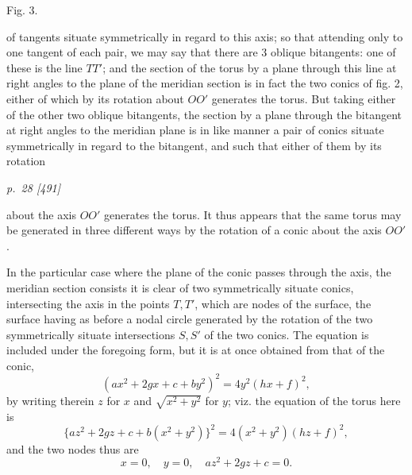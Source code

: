 ﻿\documentclass[11pt,a4paper]{article}
\theoremstyle{plain}
\theoremstyle{definition}
\begin{document}
\begin{center}
\small Fig. 3.

\end{center}

of tangents situate symmetrically in regard to this axis; so that attending
only to one tangent of each pair, we may say that there are 3 oblique
bitangents: one of these is the line \(TT'\); and the section of the torus by
a plane through this line at right angles to the plane of the meridian section
is in fact the two conics of fig. 2, either of which by its rotation about
\(OO'\) generates the torus. But taking either of the other two oblique
bitangents, the section by a plane through the bitangent at right angles to
the meridian plane is in like manner a pair of conics situate symmetrically in
regard to the bitangent, and such that either of them by its rotation

\clearpage
\textit{p.~28 [491]}

about the axis \(OO'\) generates the torus. It thus appears that the same
torus may be generated in three different ways by the rotation of a conic
about the axis \(OO'\).

In the particular case where the plane of the conic passes through the axis,
the meridian section consists it is clear of two symmetrically situate conics,
intersecting the axis in the points \(T,T'\), which are nodes of the surface,
the surface having as before a nodal circle generated by the rotation of the
two symmetrically situate intersections \(S,S'\) of the two conics. The equation
is included under the foregoing form, but it is at once obtained from that of
the conic,
\[
(ax^2+2gx+c+by^2)^2=4y^2(hx+f)^2,
\]
by writing therein \(z\) for \(x\) and \(\sqrt{x^2+y^2}\) for \(y\); viz. the
equation of the torus here is
\[
\{az^2+2gz+c+b(x^2+y^2)\}^2=4(x^2+y^2)(hz+f)^2,
\]
and the two nodes thus are
\[
x=0,\quad y=0,\quad az^2+2gz+c=0.
\]
\end{document}
